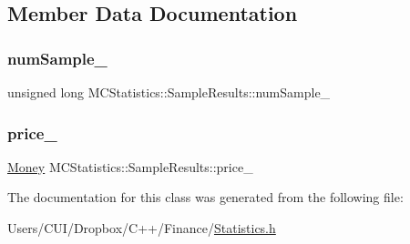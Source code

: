 \subsection{Member Data Documentation}
\hypertarget{class_m_c_statistics_1_1_sample_results_a068edc7e162d279df3df01df775f431a}{}\label{class_m_c_statistics_1_1_sample_results_a068edc7e162d279df3df01df775f431a} 
\subsubsection{\texorpdfstring{num\+Sample\+\_\+}{numSample\_}}
{\footnotesize\ttfamily unsigned long M\+C\+Statistics\+::\+Sample\+Results\+::num\+Sample\+\_\+}

\hypertarget{class_m_c_statistics_1_1_sample_results_a942ac0f979f34804055ff0f5287516f1}{}\label{class_m_c_statistics_1_1_sample_results_a942ac0f979f34804055ff0f5287516f1} 
\subsubsection{\texorpdfstring{price\+\_\+}{price\_}}
{\footnotesize\ttfamily \hyperlink{_name_def_8h_a5a9d48c16a694e9a2d9f1eca730dc8c5}{Money} M\+C\+Statistics\+::\+Sample\+Results\+::price\+\_\+}



The documentation for this class was generated from the following file\+:\begin{DoxyCompactItemize}
\item 
Users/\+C\+U\+I/\+Dropbox/\+C++/\+Finance/\hyperlink{_statistics_8h}{Statistics.\+h}\end{DoxyCompactItemize}
